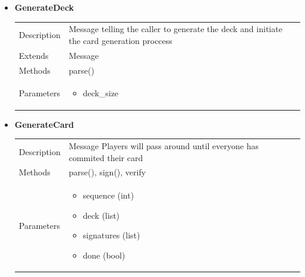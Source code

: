 \documentclass[11pt]{article}
\begin{document}
\begin{itemize}
\item
  \textbf{GenerateDeck} 

	
  \begin{longtable}[]{@{}ll@{}}
  \toprule
  \endhead
  \begin{minipage}[t]{0.40\columnwidth}\raggedright
  Description\strut
  \end{minipage} & \begin{minipage}[t]{0.54\columnwidth}\raggedright
   Message telling the caller to generate the deck and initiate the card generation proccess\strut
  \end{minipage}\tabularnewline
  Extends & Message\tabularnewline
  Methods & parse()\tabularnewline
  \begin{minipage}[t]{0.40\columnwidth}\raggedright
  Parameters\strut
  \end{minipage} & \begin{minipage}[t]{0.54\columnwidth}\raggedright
  \begin{itemize}
  	\item deck\_size
  \end{itemize}\strut
  \end{minipage}\tabularnewline
  \bottomrule
  \end{longtable}  
  
\item
  \textbf{GenerateCard}

  
  \begin{longtable}[]{@{}ll@{}}
  \toprule
  \endhead
  \begin{minipage}[t]{0.40\columnwidth}\raggedright
  Description\strut
  \end{minipage} & \begin{minipage}[t]{0.54\columnwidth}\raggedright
   Message Players will pass around until everyone has commited their card\strut
  \end{minipage}\tabularnewline
  Methods & parse(), sign(), verify\tabularnewline
  \begin{minipage}[t]{0.40\columnwidth}\raggedright
  Parameters\strut
  \end{minipage} & \begin{minipage}[t]{0.54\columnwidth}\raggedright
  \begin{itemize}
  	\item sequence (int)
  	\item deck (list)
	\item signatures (list)
	\item done (bool)
  \end{itemize}\strut
  \end{minipage}\tabularnewline
  \bottomrule
  \end{longtable}  


\end{itemize}
\end{document}
